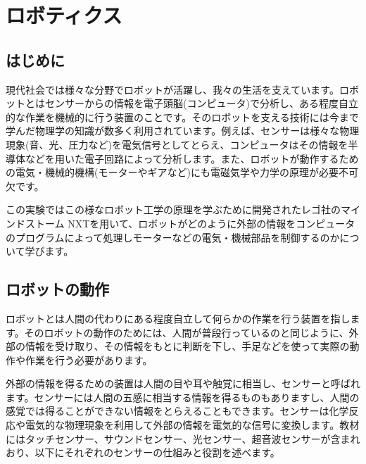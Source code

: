%
%


\section{ロボティクス}

\subsection{はじめに}

現代社会では様々な分野でロボットが活躍し、我々の生活を支えています。ロボットとはセンサーからの情報を電子頭脳(コンピュータ)で分析し、ある程度自立的な作業を機械的に行う装置のことです。そのロボットを支える技術には今まで学んだ物理学の知識が数多く利用されています。例えば、センサーは様々な物理現象(音、光、圧力など)を電気信号としてとらえ、コンピュータはその情報を半導体などを用いた電子回路によって分析します。また、ロボットが動作するための電気・機械的機構(モーターやギアなど)にも電磁気学や力学の原理が必要不可欠です。

この実験ではこの様なロボット工学の原理を学ぶために開発されたレゴ社のマインドストーム NXTを用いて、ロボットがどのように外部の情報をコンピュータのプログラムによって処理しモーターなどの電気・機械部品を制御するのかについて学びます。


\subsection{ロボットの動作}

ロボットとは人間の代わりにある程度自立して何らかの作業を行う装置を指します。そのロボットの動作のためには、人間が普段行っているのと同じように、外部の情報を受け取り、その情報をもとに判断を下し、手足などを使って実際の動作や作業を行う必要があります。

外部の情報を得るための装置は人間の目や耳や触覚に相当し、センサーと呼ばれます。センサーには人間の五感に相当する情報を得るものもありますし、人間の感覚では得ることができない情報をとらえることもできます。センサーは化学反応や電気的な物理現象を利用して外部の情報を電気的な信号に変換します。教材にはタッチセンサー、サウンドセンサー、光センサー、超音波センサーが含まれおり、以下にそれぞれのセンサーの仕組みと役割を述べます。

